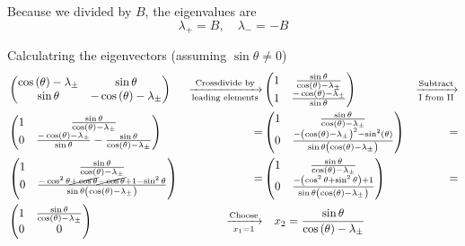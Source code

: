 \documentclass[a4paper,german,12pt,smallheadings]{scrartcl}
\begin{document}
\begin{enumerate}[a)]
    Because we divided by $B$, the eigenvalues are
    \begin{equation*}
      \lambda_+ = B,\quad \lambda_- = -B
    \end{equation*}

    Calculatring the eigenvectors (assuming $\sin\theta \neq 0$)
    \begin{align*}
      &\begin{pmatrix}
        \cos\del\theta - \lambda_\pm & \sin \theta \\
        \sin\theta & -\cos\del\theta - \lambda_\pm \\
      \end{pmatrix}
      &\xrightarrow[\text{leading elements}]{\text{Crossdivide by}}&
      \begin{pmatrix}
        1 & \frac{\sin \theta}{\cos\del\theta-\lambda_\pm} \\
        1 & \frac{-\cos\del\theta - \lambda_\pm}{\sin\theta} \\
      \end{pmatrix}
      &\xrightarrow[\text{I from II}]{\text{Subtract}} \\
      &\begin{pmatrix}
        1 & \frac{\sin \theta}{\cos\del\theta-\lambda_\pm} \\
        0 & \frac{-\cos\del\theta - \lambda_\pm}{\sin\theta} - \frac{\sin \theta}{\cos\del\theta-\lambda_\pm} \\
      \end{pmatrix}
      &=&
      \begin{pmatrix}
        1 & \frac{\sin \theta}{\cos\del\theta-\lambda_\pm} \\
        0 & \frac{-\del{\cos\del\theta - \lambda_\pm}^2 - \sin^2\del\theta}{\sin\theta\del{\cos\del\theta-\lambda_\pm}} \\
      \end{pmatrix}
      &= \\
      &\begin{pmatrix}
        1 & \frac{\sin \theta}{\cos\del\theta-\lambda_\pm} \\
        0 & \frac{-\cos^2\theta\cancel{+\cos\theta}\cancel{-\cos\theta}+1-\sin^2\theta}{\sin\theta\del{\cos\del\theta-\lambda_\pm}} \\
      \end{pmatrix}
      &=&
      \begin{pmatrix}
        1 & \frac{\sin \theta}{\cos\del\theta-\lambda_\pm} \\
        0 & \frac{-\del{\cos^2\theta+\sin^2\theta}+1}{\sin\theta\del{\cos\del\theta-\lambda_\pm}} \\
      \end{pmatrix}
      &= \\
      &\begin{pmatrix}
        1 & \frac{\sin \theta}{\cos\del\theta-\lambda_\pm} \\
        0 & 0 \\
      \end{pmatrix}
      &\xrightarrow[x_1 = 1]{\text{Choose}}&
      \quad x_2 = \frac{\sin\theta}{\cos\del\theta - \lambda_\pm}
    \end{align*}


\end{enumerate}
\end{document}
